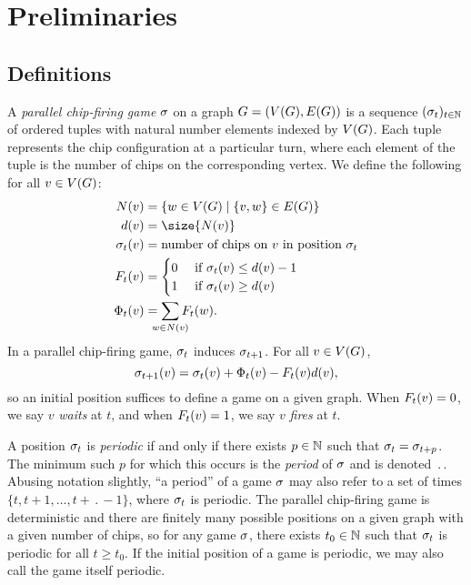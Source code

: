 \section{Preliminaries} \label{pres}

\subsection*{Definitions}
A \emph{parallel chip-firing game} $\sigma$ on a graph $G = (V(G), E(G))$ is a sequence
$(\sigma_{t})_{t \in \mathbb{N}}$ of ordered tuples with natural number elements
indexed by $V(G)$. Each tuple represents the chip configuration at a particular
turn, where each element of the tuple is the number of chips on the
corresponding vertex. We define the following for all $v \in V(G)$:
\begin{align*}
  \N{v} &= \set{w \in \V}{\{v,w\} \in \E} \\
  \deg{v} &= \size{\N{v}} \\
  \chips{v}{t} &= \text{number of chips on $v$ in position $\pos{t}$} \\
  \firing{v}{t} &= \begin{cases}
    0 &\text{ if } \chips{v}{t} \leq \deg[]{v} - 1 \\
    1 &\text{ if } \chips{v}{t} \geq \deg[]{v}
  \end{cases} \\
  \receiving{v}{t} &= \sum_{\mathclap{w \in \N{v}}} \firing{w}{t}.
\end{align*}
In a parallel chip-firing game, $\sigma_{t}$ induces $\sigma_{t+1}$. For all $v \in
V(G)$,
\begin{equation}\label{gameDef}
  \chips{v}{t+1} = \chips{v}{t} + \receiving{v}{t} - \firing{v}{t}\deg[]{v},
\end{equation}
so an initial position suffices to define a game on a given graph. When
$\firing{v}{t} = 0$, we say $v$ \emph{waits} at $t$, and when $\firing{v}{t} =
1$, we say $v$ \emph{fires} at $t$.

A position $\sigma_{t}$ is \emph{periodic} if and only if there exists $p \in \mathbb{N}$ such
that $\sigma_{t} = \sigma_{t+p}$. The minimum such $p$ for which this occurs is the
\emph{period} of $\sigma$ and is denoted $\period$. Abusing notation slightly, ``a
period'' of a game $\sigma$ may also refer to a set of times $\{t, t+1, \dots,
t+\period-1\}$, where $\sigma_{t}$ is periodic. The parallel chip-firing game is
deterministic and there are finitely many possible positions on a given graph
with a given number of chips, so for any game $\sigma$, there exists $t_0 \in
\mathbb{N}$ such that $\sigma_{t}$ is periodic for all $t \geq t_0$. If the initial
position of a game is periodic, we may also call the game itself periodic.

